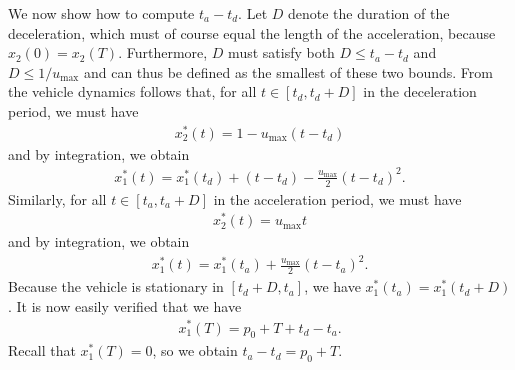 \documentclass[a4paper]{article}
\theoremstyle{definition}
\theoremstyle{plain}
\begin{document}
We now show how to compute $t_{a} - t_{d}$. Let $D$ denote the duration of the
deceleration, which must of course equal the length of the acceleration, because
$x_{2}(0) = x_{2}(T)$. Furthermore, $D$ must satisfy both $D \leq t_{a} - t_{d}$
and $D \leq 1 / u_{\max}$ and can thus be defined as the smallest of these two
bounds.
%
From the vehicle dynamics follows that, for all $t \in [t_{d}, t_{d} + D]$ in
the deceleration period, we must have
\begin{align*}
  x_{2}^{*}(t) = 1 - u_{\max} (t-t_{d})
\end{align*}
and by integration, we obtain
\begin{align*}
  x_{1}^{*}(t) = x_{1}^{*}(t_{d}) + (t - t_{d}) - \frac{u_{\max}}{2}(t - t_{d})^{2} .
\end{align*}
%
Similarly, for all $t \in [t_{a}, t_{a} + D]$ in the acceleration period, we must have
\begin{align*}
  x_{2}^{*}(t) = u_{\max} t
\end{align*}
and by integration, we obtain
\begin{align*}
  x_{1}^{*}(t) = x_{1}^{*}(t_{a}) + \frac{u_{\max}}{2}(t - t_{a})^{2} .
\end{align*}
%
Because the vehicle is stationary in $[t_{d} + D, t_{a}]$, we have
$x_{1}^{*}(t_{a}) = x_{1}^{*}(t_{d} + D)$.
It is now easily verified that we have
\begin{align*}
  x^{*}_{1}(T) = p_{0} + T + t_{d} - t_{a} .
\end{align*}
Recall that $x^{*}_{1}(T) = 0$, so we obtain $t_{a} - t_{d} = p_{0} + T$.
\end{document}
